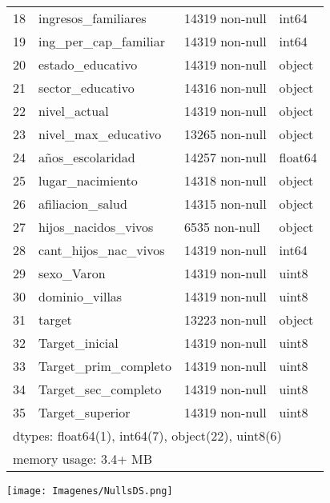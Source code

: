 \documentclass[a4paper]{article}
\begin{document}
\begin{table}[H]
\begin{center}
\begin{tabular}{clll}
        18 & ingresos\_familiares         & 14319 non-null & int64   \\
        19 & ing\_per\_cap\_familiar        & 14319 non-null & int64   \\
        20 & estado\_educativo            & 14319 non-null & object  \\
        21 & sector\_educativo            & 14316 non-null & object  \\
        22 & nivel\_actual                & 14319 non-null & object  \\
        23 & nivel\_max\_educativo         & 13265 non-null & object  \\
        24 & años\_escolaridad            & 14257 non-null & float64 \\
        25 & lugar\_nacimiento            & 14318 non-null & object  \\
        26 & afiliacion\_salud            & 14315 non-null & object  \\
        27 & hijos\_nacidos\_vivos         & 6535 non-null  & object  \\
        28 & cant\_hijos\_nac\_vivos        & 14319 non-null & int64   \\
        29 & sexo\_Varon                  & 14319 non-null & uint8   \\
        30 & dominio\_villas              & 14319 non-null & uint8   \\
        31 & target                      & 13223 non-null & object  \\
        32 & Target\_inicial              & 14319 non-null & uint8   \\
        33 & Target\_prim\_completo        & 14319 non-null & uint8   \\
        34 & Target\_sec\_completo         & 14319 non-null & uint8   \\
        35 & Target\_superior             & 14319 non-null & uint8   \\
        \multicolumn{4}{l}{dtypes: float64(1), int64(7), object(22), uint8(6)}  \\
        \multicolumn{4}{l}{memory usage: 3.4+ MB}
    \end{tabular}\end{center}
    \end{table}

    \begin{center}
        \texttt{[image: Imagenes/NullsDS.png]}
    \end{center}
\end{document}
